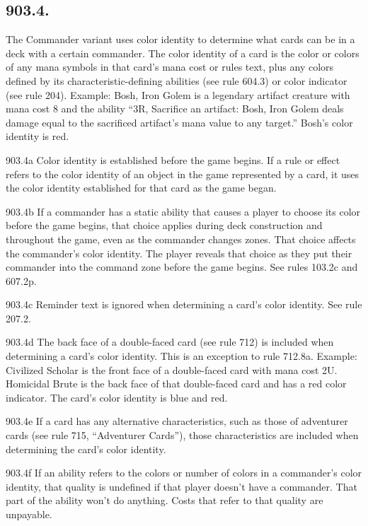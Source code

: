 \subsection*{903.4.}
The Commander variant uses color identity to determine what cards can be in a deck with a certain commander. The color identity of a card is the color or colors of any mana symbols in that card’s mana cost or rules text, plus any colors defined by its characteristic-defining abilities (see rule 604.3) or color indicator (see rule 204).
Example: Bosh, Iron Golem is a legendary artifact creature with mana cost {8} and the ability “{3}{R}, Sacrifice an artifact: Bosh, Iron Golem deals damage equal to the sacrificed artifact’s mana value to any target.” Bosh’s color identity is red.

903.4a Color identity is established before the game begins. If a rule or effect refers to the color identity of an object in the game represented by a card, it uses the color identity established for that card as the game began.

903.4b If a commander has a static ability that causes a player to choose its color before the game begins, that choice applies during deck construction and throughout the game, even as the commander changes zones. That choice affects the commander’s color identity. The player reveals that choice as they put their commander into the command zone before the game begins. See rules 103.2c and 607.2p.

903.4c Reminder text is ignored when determining a card’s color identity. See rule 207.2.

903.4d The back face of a double-faced card (see rule 712) is included when determining a card’s color identity. This is an exception to rule 712.8a.
Example: Civilized Scholar is the front face of a double-faced card with mana cost {2}{U}. Homicidal Brute is the back face of that double-faced card and has a red color indicator. The card’s color identity is blue and red.

903.4e If a card has any alternative characteristics, such as those of adventurer cards (see rule 715, “Adventurer Cards”), those characteristics are included when determining the card’s color identity.

903.4f If an ability refers to the colors or number of colors in a commander’s color identity, that quality is undefined if that player doesn’t have a commander. That part of the ability won’t do anything. Costs that refer to that quality are unpayable.

